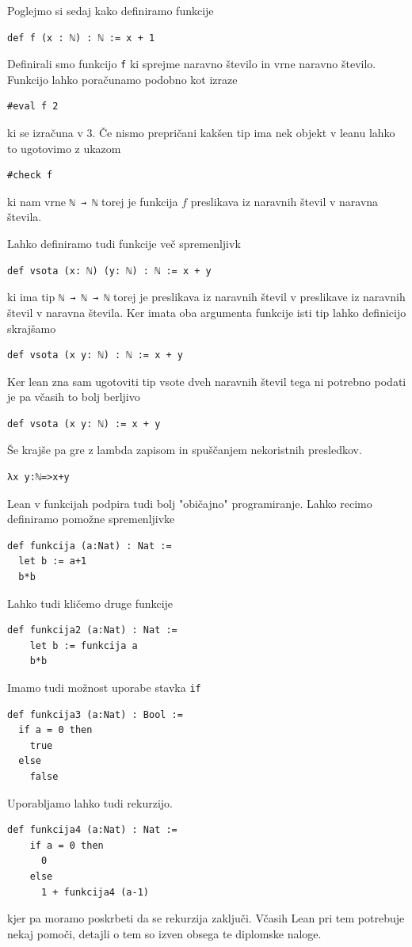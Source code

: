 \documentclass[mat1]{fmfdelo}
\begin{document}
Poglejmo si sedaj kako definiramo funkcije
\begin{lstlisting}
def f (x : ℕ) : ℕ := x + 1
\end{lstlisting}
Definirali smo funkcijo \lstinline{f} ki sprejme naravno število in vrne naravno število. Funkcijo lahko poračunamo podobno kot izraze
\begin{lstlisting}
#eval f 2
\end{lstlisting}
ki se izračuna v 3. Če nismo prepričani kakšen tip ima nek objekt v leanu lahko to ugotovimo z ukazom
\begin{lstlisting}
#check f
\end{lstlisting}
ki nam vrne \lstinline{ℕ → ℕ} torej je funkcija $f$ preslikava iz naravnih števil v naravna števila.

Lahko definiramo tudi funkcije več spremenljivk
\begin{lstlisting}
def vsota (x: ℕ) (y: ℕ) : ℕ := x + y
\end{lstlisting}
ki ima tip \lstinline{ℕ → ℕ → ℕ} torej je preslikava iz naravnih števil v preslikave iz naravnih števil v naravna števila.
Ker imata oba argumenta funkcije isti tip lahko definicijo skrajšamo
\begin{lstlisting}
def vsota (x y: ℕ) : ℕ := x + y
\end{lstlisting}
Ker lean zna sam ugotoviti tip vsote dveh naravnih števil tega ni potrebno podati je pa včasih to bolj berljivo
\begin{lstlisting}
def vsota (x y: ℕ) := x + y
\end{lstlisting}
Še krajše pa gre z lambda zapisom in spuščanjem nekoristnih presledkov.
\begin{lstlisting}
λx y:ℕ=>x+y
\end{lstlisting}

Lean v funkcijah podpira tudi bolj "običajno" programiranje. Lahko recimo definiramo pomožne spremenljivke
\begin{lstlisting}
def funkcija (a:Nat) : Nat := 
  let b := a+1
  b*b
\end{lstlisting}

Lahko tudi kličemo druge funkcije
\begin{lstlisting}
def funkcija2 (a:Nat) : Nat :=
    let b := funkcija a
    b*b
\end{lstlisting}

Imamo tudi možnost uporabe stavka \lstinline{if}
\begin{lstlisting}
def funkcija3 (a:Nat) : Bool :=
  if a = 0 then
    true
  else
    false
\end{lstlisting}
Uporabljamo lahko tudi rekurzijo.
\begin{lstlisting}
def funkcija4 (a:Nat) : Nat :=
    if a = 0 then
      0
    else
      1 + funkcija4 (a-1)
\end{lstlisting}
kjer pa moramo poskrbeti da se rekurzija zaključi. Včasih Lean pri tem potrebuje nekaj pomoči, detajli o tem so izven obsega te diplomske naloge.
\end{document}

